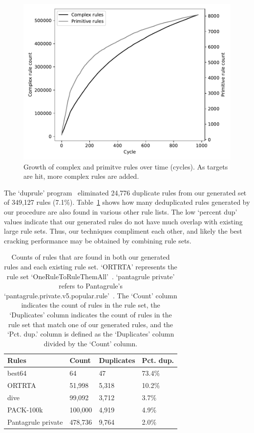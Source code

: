 \documentclass[letterpaper,twocolumn,10pt]{article}
\begin{document}
\begin{figure}[h]
\includegraphics[width=\linewidth]
{analysis/passwords-analysis/stats-rules_composites_size.pdf}
\caption{Growth of complex and primitve rules over time (cycles). As targets
are hit, more complex rules are added. }
\label{fig:rule-count}
\end{figure}

The `duprule' program~\cite{duprule} eliminated 24,776 duplicate rules from our
generated set of 349,127 rules (7.1\%). Table~\ref{tab:dups} shows how many
deduplicated rules generated by our procedure are also found in various other
rule lists. The low `percent dup' values indicate that our generated rules do
not have much overlap with existing large rule sets. Thus, our techniques
compliment each other, and likely the best cracking performance may be obtained
by combining rule sets.

\begin{table}
\centering
\begin{tabular}{|l|l|l|l|}
    \hline
    Rules & Count & Duplicates & Pct. dup. \\
    \hline
    best64 & 64 & 47 & 73.4\% \\
    ORTRTA & 51,998 & 5,318 & 10.2\% \\
    dive & 99,092 & 3,712 & 3.7\% \\
    PACK-100k & 100,000 & 4,919 & 4.9\% \\
    Pantagrule private & 478,736 & 9,764 & 2.0\% \\
    \hline
\end{tabular}
\caption{Counts of rules that are found in both our generated rules and each
existing rule set. `ORTRTA' represents the rule set
`OneRuleToRuleThemAll'~\cite{ortrta}. `pantagrule private' refers to
Pantagrule's `pantagrule.private.v5.popular.rule'~\cite{pantagrule}. The `Count'
column indicates the count of rules in the rule set, the `Duplicates' column
indicates the count of rules in the rule set that match one of our generated
rules, and the `Pct. dup.' column is defined as the `Duplicates' column divided
by the `Count' column.}
\label{tab:dups}
\end{table}
\end{document}
